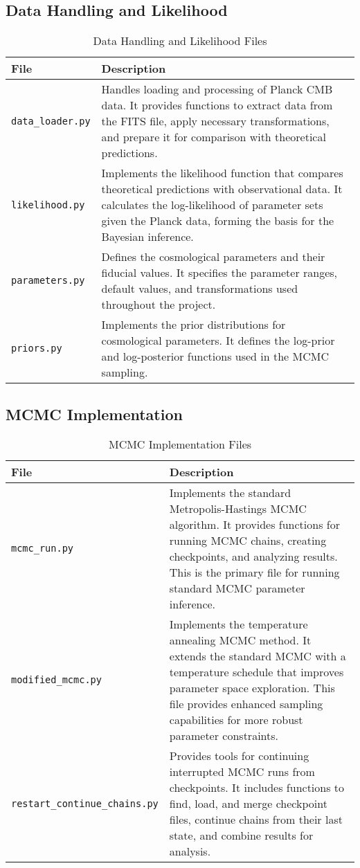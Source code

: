\documentclass[11pt]{article}
\begin{document}
\subsection{Data Handling and Likelihood}

\begin{table}[H]
\centering
\begin{tabular}{p{4cm}p{11cm}}
\toprule
\textbf{File} & \textbf{Description} \\
\midrule
\texttt{data\_loader.py} & Handles loading and processing of Planck CMB data. It provides functions to extract data from the FITS file, apply necessary transformations, and prepare it for comparison with theoretical predictions. \\
\addlinespace
\texttt{likelihood.py} & Implements the likelihood function that compares theoretical predictions with observational data. It calculates the log-likelihood of parameter sets given the Planck data, forming the basis for the Bayesian inference. \\
\addlinespace
\texttt{parameters.py} & Defines the cosmological parameters and their fiducial values. It specifies the parameter ranges, default values, and transformations used throughout the project. \\
\addlinespace
\texttt{priors.py} & Implements the prior distributions for cosmological parameters. It defines the log-prior and log-posterior functions used in the MCMC sampling. \\
\bottomrule
\end{tabular}
\caption{Data Handling and Likelihood Files}
\label{tab:data-likelihood-files}
\end{table}

\subsection{MCMC Implementation}

\begin{table}[H]
\centering
\begin{tabular}{p{4cm}p{11cm}}
\toprule
\textbf{File} & \textbf{Description} \\
\midrule
\texttt{mcmc\_run.py} & Implements the standard Metropolis-Hastings MCMC algorithm. It provides functions for running MCMC chains, creating checkpoints, and analyzing results. This is the primary file for running standard MCMC parameter inference. \\
\addlinespace
\texttt{modified\_mcmc.py} & Implements the temperature annealing MCMC method. It extends the standard MCMC with a temperature schedule that improves parameter space exploration. This file provides enhanced sampling capabilities for more robust parameter constraints. \\
\addlinespace
\texttt{restart\_continue\_chains.py} & Provides tools for continuing interrupted MCMC runs from checkpoints. It includes functions to find, load, and merge checkpoint files, continue chains from their last state, and combine results for analysis. \\
\bottomrule
\end{tabular}
\caption{MCMC Implementation Files}
\label{tab:mcmc-files}
\end{table}
\end{document}
